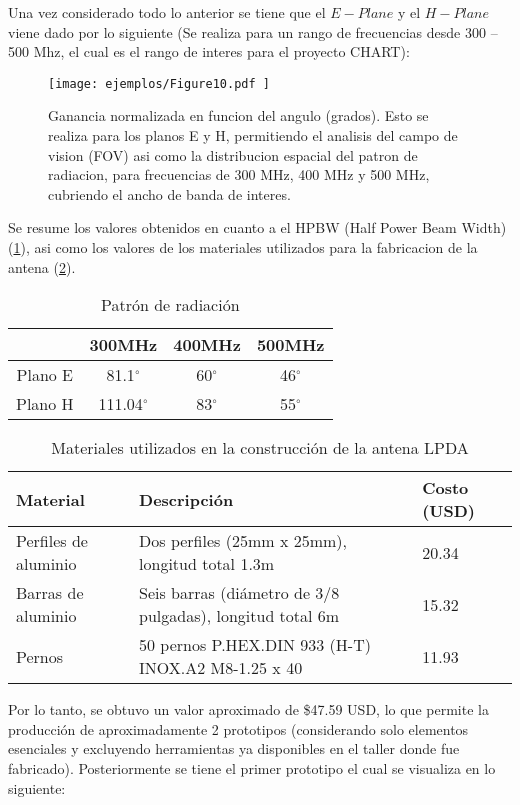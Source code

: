 Una vez considerado todo lo anterior se tiene que el $E - Plane$ y el $H - Plane$ viene dado por lo siguiente (Se realiza para un rango de frecuencias desde 300 -- 500 Mhz, el cual es el rango de interes para el proyecto CHART):
\begin{figure}
	\centering
	\texttt{[image: ejemplos/Figure10.pdf ]}
	\caption{Ganancia normalizada en funcion del angulo (grados). Esto se realiza para los planos E y H, permitiendo el analisis
	del campo de vision (FOV) asi como la distribucion espacial del patron de radiacion, para frecuencias de 300 MHz, 400
	MHz y 500 MHz, cubriendo el ancho de banda de interes.}
	\label{fig:esqumea_antena}
\end{figure}
Se resume los valores obtenidos en cuanto a el HPBW (Half Power Beam Width) (\ref{tab:lpda_beamwidth}), asi como los valores de los materiales utilizados para la fabricacion de la antena (\ref{tab:Materials_LPDA}).
  \begin{table}
      \centering
      \begin{tabular}{|c|c|c|c|}
          \hline
          & 300MHz & 400MHz & 500MHz \\
          \hline
          Plano E & 81.1$^{\circ}$   &  60$^{\circ}$ & 46$^{\circ}$ \\
          Plano H & 111.04$^{\circ}$  & 83$^{\circ}$  & 55$^{\circ}$ \\
          \hline
      \end{tabular}
      \caption{Patrón de radiación}
      \label{tab:lpda_beamwidth}
  \end{table}
    \begin{table}[H]
      \centering
      \caption{Materiales utilizados en la construcción de la antena LPDA}
      \label{tab:Materials_LPDA}
      \begin{tabular}{|l|l|l|}
          \hline
          \textbf{Material} & \textbf{Descripción} & \textbf{Costo (USD)} \\ \hline
          Perfiles de aluminio & Dos perfiles (25mm x 25mm), longitud total 1.3m & 20.34 \\ \hline
          Barras de aluminio & Seis barras (diámetro de 3/8 pulgadas), longitud total 6m & 15.32 \\ \hline
          Pernos & 50 pernos P.HEX.DIN 933 (H-T) INOX.A2 M8-1.25 x 40 & 11.93 \\ \hline
      \end{tabular}
  \end{table}
  Por lo tanto, se obtuvo un valor aproximado de \$47.59 USD, lo que permite la producción de aproximadamente 2 prototipos (considerando solo elementos esenciales y excluyendo herramientas ya disponibles en el taller donde fue fabricado). Posteriormente se tiene el primer prototipo el cual se visualiza en lo siguiente:
